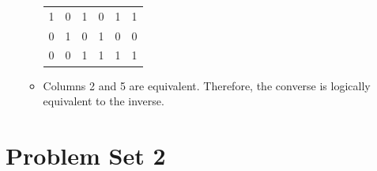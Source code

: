 \documentclass[12pt]{article}
\begin{document}
\begin{enumerate}[label = \alph*)]
\begin{itemize}
\begin{tabular}{cc|c|c|c|c}
                    1 & 0 & 1 & 0 & 1 & 1 \\
                    0 & 1 & 0 & 1 & 0 & 0 \\
                    0 & 0 & 1 & 1 & 1 & 1 \\
                \end{tabular}
            \item []
                \vspace{0.5em}
                Columns 2 and 5 are equivalent. Therefore, the converse is logically
                equivalent to the inverse.
        \end{itemize}
\end{enumerate}

\section*{Problem Set 2}
\end{document}
